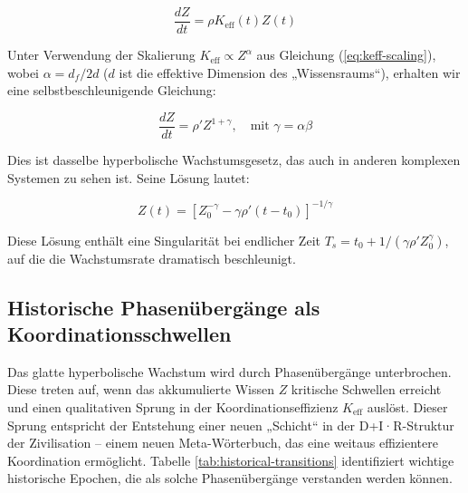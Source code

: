 \documentclass[12pt,a4paper]{article}
\theoremstyle{remark}
\newcommand{\df}{d_{\!f}}
\begin{document}
	\begin{equation}
		\frac{dZ}{dt} = \rho K_{\text{eff}}(t) Z(t)
		\label{eq:Z-growth}
	\end{equation}
	
	Unter Verwendung der Skalierung $K_{\text{eff}} \propto Z^{\alpha}$ aus Gleichung (\ref{eq:keff-scaling}), wobei $\alpha = \df/2d$ ($d$ ist die effektive Dimension des „Wissensraums“), erhalten wir eine selbstbeschleunigende Gleichung:
	
	\begin{equation}
		\frac{dZ}{dt} = \rho' Z^{1+\gamma}, \quad \text{mit } \gamma = \alpha \beta
		\label{eq:Z-self-accel}
	\end{equation}
	
	Dies ist dasselbe hyperbolische Wachstumsgesetz, das auch in anderen komplexen Systemen zu sehen ist. Seine Lösung lautet:
	
	\begin{equation}
		Z(t) = \left[ Z_0^{-\gamma} - \gamma \rho' (t - t_0) \right]^{-1/\gamma}
		\label{eq:Z-hyperbolic}
	\end{equation}
	
	Diese Lösung enthält eine Singularität bei endlicher Zeit $T_s = t_0 + 1/(\gamma \rho' Z_0^{\gamma})$, auf die die Wachstumsrate dramatisch beschleunigt.
	
	\subsection{Historische Phasenübergänge als Koordinationsschwellen}
	
	Das glatte hyperbolische Wachstum wird durch Phasenübergänge unterbrochen. Diese treten auf, wenn das akkumulierte Wissen $Z$ kritische Schwellen erreicht und einen qualitativen Sprung in der Koordinationseffizienz $K_{\text{eff}}$ auslöst. Dieser Sprung entspricht der Entstehung einer neuen „Schicht“ in der D+I·R-Struktur der Zivilisation – einem neuen Meta-Wörterbuch, das eine weitaus effizientere Koordination ermöglicht. Tabelle \ref{tab:historical-transitions} identifiziert wichtige historische Epochen, die als solche Phasenübergänge verstanden werden können.
	
\end{document}
